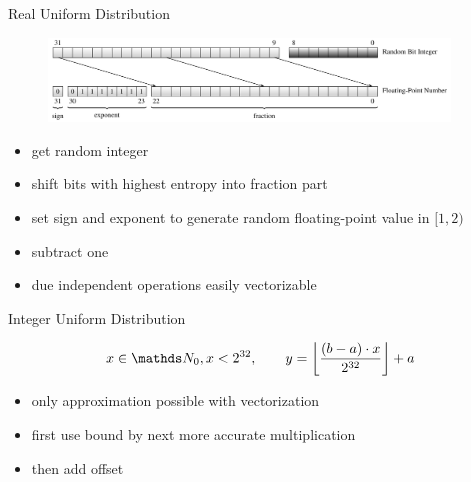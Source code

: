 \documentclass[aspectratio=169]{beamer}
\begin{document}
    \begin{frame}{Real Uniform Distribution}
      \begin{figure}
        \includegraphics[width=0.95\textwidth]{figures/uniform_implementation_scheme.pdf}
      \end{figure}
      \begin{itemize}
        \item get random integer
        \item shift bits with highest entropy into fraction part
        \item set sign and exponent to generate random floating-point value in $[1,2)$
        \item subtract one
        \item due independent operations easily vectorizable
      \end{itemize}
    \end{frame}

    \begin{frame}{Integer Uniform Distribution}
      \begin{mybox}
        \[
          x\in\setNatural_0, x < 2^{32},\qquad y = \floorBrackets{\frac{(b-a)\cdot x}{2^{32}}} + a
        \]
      \end{mybox}
      \begin{itemize}
        \item only approximation possible with vectorization
        \item first use bound by next more accurate multiplication
        \item then add offset
      \end{itemize}
    \end{frame}
\end{document}
